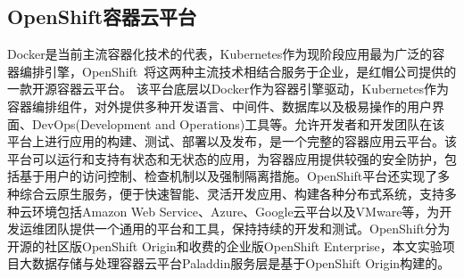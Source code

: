 \subsection{OpenShift容器云平台}
\label{chap1:sample:table} 
Docker是当前主流容器化技术的代表，Kubernetes作为现阶段应用最为广泛的容器编排引擎，OpenShift~\cite{Lossent2017PaaS}将这两种主流技术相结合服务于企业，是红帽公司提供的一款开源容器云平台。
该平台底层以Docker作为容器引擎驱动，Kubernetes作为容器编排组件，对外提供多种开发语言、中间件、数据库以及极易操作的用户界面、DevOps(Development and Operations)工具等。允许开发者和开发团队在该平台上进行应用的构建、测试、部署以及发布，是一个完整的容器应用云平台。该平台可以运行和支持有状态和无状态的应用，为容器应用提供较强的安全防护，包括基于用户的访问控制、检查机制以及强制隔离措施。OpenShift平台还实现了多种综合云原生服务，便于快速智能、灵活开发应用、构建各种分布式系统，支持多种云环境包括Amazon Web Service、Azure、Google云平台以及VMware等，为开发运维团队提供一个通用的平台和工具，保持持续的开发和测试。OpenShift分为开源的社区版OpenShift Origin和收费的企业版OpenShift Enterprise，本文实验项目大数据存储与处理容器云平台Paladdin服务层是基于OpenShift Origin构建的。

